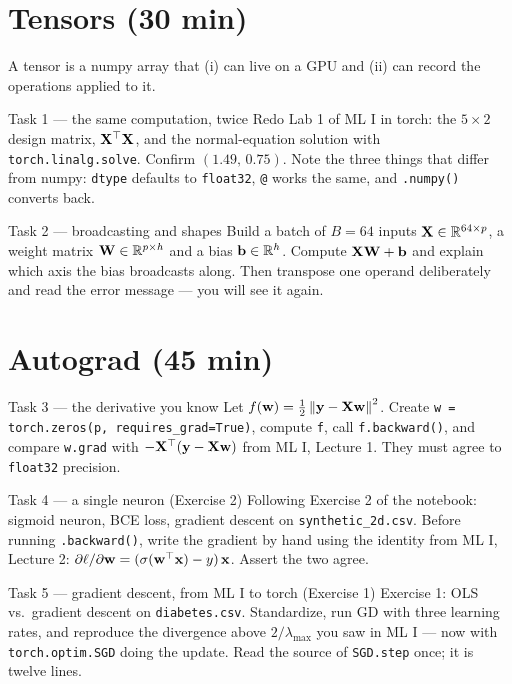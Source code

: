 \documentclass[11pt]{article}
\begin{document}
\section{Tensors (30 min)}
A tensor is a numpy array that (i) can live on a GPU and (ii) can record the operations applied to it.
\begin{task}{Task 1 --- the same computation, twice}
Redo Lab 1 of ML I in torch: the $5\times2$ design matrix, $\mathbf{X}^{\top}\mathbf{X}$, and the normal-equation solution
with \texttt{torch.linalg.solve}. Confirm $(1.49,\,0.75)$. Note the three things that differ from numpy:
\texttt{dtype} defaults to \texttt{float32}, \texttt{@} works the same, and \texttt{.numpy()} converts back.
\end{task}
\begin{task}{Task 2 --- broadcasting and shapes}
Build a batch of $B=64$ inputs $\mathbf{X}\in\mathbb{R}^{64\times p}$, a weight matrix $\mathbf{W}\in\mathbb{R}^{p\times h}$ and a bias
$\mathbf{b}\in\mathbb{R}^h$. Compute $\mathbf{X}\mathbf{W}+\mathbf{b}$ and explain which axis the bias broadcasts along. Then transpose one
operand deliberately and read the error message --- you will see it again.
\end{task}

\section{Autograd (45 min)}
\begin{task}{Task 3 --- the derivative you know}
Let $f(\mathbf{w})=\tfrac12\left\lVert \mathbf{y}-\mathbf{X}\mathbf{w} \right\rVert^2$. Create \texttt{w = torch.zeros(p, requires\_grad=True)},
compute \texttt{f}, call \texttt{f.backward()}, and compare \texttt{w.grad} with $-\mathbf{X}^{\top}(\mathbf{y}-\mathbf{X}\mathbf{w})$ from
ML I, Lecture 1. They must agree to \texttt{float32} precision.
\end{task}
\begin{task}{Task 4 --- a single neuron (Exercise 2)}
Following Exercise 2 of the notebook: sigmoid neuron, BCE loss, gradient descent on
\texttt{synthetic\_2d.csv}. Before running \texttt{.backward()}, write the gradient by hand using the
identity from ML I, Lecture 2: $\partial\ell/\partial\mathbf{w}=(\sigma(\mathbf{w}^{\top}\mathbf{x})-y)\,\mathbf{x}$. Assert the two agree.
\end{task}
\begin{task}{Task 5 --- gradient descent, from ML I to torch (Exercise 1)}
Exercise 1: OLS vs.\ gradient descent on \texttt{diabetes.csv}. Standardize, run GD with three learning
rates, and reproduce the divergence above $2/\lambda_{\max}$ you saw in ML I --- now with
\texttt{torch.optim.SGD} doing the update. Read the source of \texttt{SGD.step} once; it is twelve lines.
\end{task}
\end{document}
